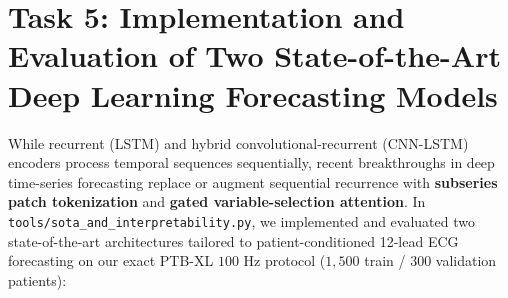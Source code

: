 \documentclass[11pt,a4paper]{article}
\begin{document}
\section{Task 5: Implementation and Evaluation of Two State-of-the-Art Deep Learning Forecasting Models}
\label{sec:sota_models}

While recurrent (LSTM) and hybrid convolutional-recurrent (CNN-LSTM) encoders process temporal sequences sequentially, recent breakthroughs in deep time-series forecasting replace or augment sequential recurrence with \textbf{subseries patch tokenization} and \textbf{gated variable-selection attention}. In \texttt{tools/sota\_and\_interpretability.py}, we implemented and evaluated two state-of-the-art architectures tailored to patient-conditioned 12-lead ECG forecasting on our exact PTB-XL $100\text{ Hz}$ protocol ($1{,}500$ train / $300$ validation patients):
\end{document}
